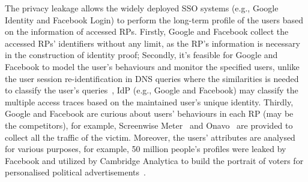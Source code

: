 

The privacy leakage allows the widely deployed SSO systems (e.g., Google Identity and Facebook Login) to perform the long-term profile of the users based on the information of accessed RPs. Firstly, Google and Facebook collect the accessed RPs' identifiers without any limit, as the RP's information is necessary in  the construction of identity proof;
Secondly, it's feasible for Google and Facebook to model the user's behaviours and monitor the specified users, unlike the user session re-identification in DNS queries where the similarities is needed to classify the user's queries~\cite{DNS}, IdP (e.g., Google and Facebook) may classify the multiple access traces based on the maintained user's unique identity.
Thirdly, Google and Facebook are curious about users' behaviours in each RP (may be the competitors), for example, Screenwise Meter~\cite{googlenews} and Onavo~\cite{Onavo} are provided to collect all the traffic of the victim.
Moreover, the users' attributes are analysed for various purposes, for example, 50 million people's profiles were leaked by Facebook and utilized by Cambridge Analytica to build the portrait of voters for personalised political advertisements~\cite{facebooknews}.

